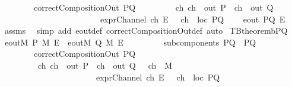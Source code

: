 \begin{isabellebody}
\ \ \ \ \ \ \ \ {\isachardoublequoteopen}correctCompositionOut\ PQ{\isachardoublequoteclose}\isanewline
\ \ \ \ \ \ \ \ {\isachardoublequoteopen}{\isasymexists}\ ch{\isachardot}\ {\isacharparenleft}{\isacharparenleft}{\isacharparenleft}ch\ {\isasymin}\ {\isacharparenleft}out\ P{\isacharparenright}{\isacharparenright}\ {\isasymor}\ {\isacharparenleft}ch\ {\isasymin}\ {\isacharparenleft}out\ Q{\isacharparenright}\ {\isacharparenright}{\isacharparenright}\ {\isasymand}\ \isanewline
\ \ \ \ \ \ \ \ \ \ \ \ \ \ \ \ \ \ \ \ \ \ \ \ {\isacharparenleft}exprChannel\ ch\ E{\isacharparenright}\ {\isasymand}\ \ {\isacharparenleft}ch\ {\isasymnotin}\ {\isacharparenleft}loc\ PQ{\isacharparenright}{\isacharparenright}{\isacharparenright}{\isachardoublequoteclose}\isanewline
{}\ \ \ \ {\isachardoublequoteopen}eout\ PQ\ E{\isachardoublequoteclose}\isanewline
%
\isadelimproof
%
\endisadelimproof
%
\isatagproof
{}\isamarkupfalse%
\ assms\ \isamarkupfalse%
\ {\isacharparenleft}simp\ add{\isacharcolon}\ eout{\isacharunderscore}def\ correctCompositionOut{\isacharunderscore}def{\isacharcomma}\ auto{\isacharparenright}%
\endisatagproof
{\isafoldproof}%
%
\isadelimproof
\isanewline
%
\endisadelimproof
\isanewline
{}\isamarkupfalse%
\ TBtheorem{}b{\isacharunderscore}PQ{\isacharcolon}\isanewline
{}\ {\isachardoublequoteopen}{\isacharparenleft}eoutM\ P\ M\ E{\isacharparenright}\ {\isasymor}\ {\isacharparenleft}eoutM\ Q\ M\ E{\isacharparenright}{\isachardoublequoteclose}\ \isanewline
\ \ \ \ \ \ \ \ {\isachardoublequoteopen}subcomponents\ PQ\ {\isacharequal}\ {\isacharbraceleft}P{\isacharcomma}Q{\isacharbraceright}{\isachardoublequoteclose}\isanewline
\ \ \ \ \ \ \ \ {\isachardoublequoteopen}correctCompositionOut\ PQ{\isachardoublequoteclose}\isanewline
\ \ \ \ \ \ \ \ {\isachardoublequoteopen}{\isasymexists}\ ch{\isachardot}\ {\isacharparenleft}{\isacharparenleft}{\isacharparenleft}ch\ {\isasymin}\ {\isacharparenleft}out\ P{\isacharparenright}{\isacharparenright}\ {\isasymor}\ {\isacharparenleft}ch\ {\isasymin}\ {\isacharparenleft}out\ Q{\isacharparenright}\ {\isacharparenright}{\isacharparenright}\ {\isasymand}\ {\isacharparenleft}ch\ {\isasymin}\ M{\isacharparenright}\ \isanewline
\ \ \ \ \ \ \ \ \ \ \ \ \ \ \ \ \ \ \ \ \ \ {\isasymand}\ {\isacharparenleft}exprChannel\ ch\ E{\isacharparenright}\ {\isasymand}\ \ {\isacharparenleft}ch\ {\isasymnotin}\ {\isacharparenleft}loc\ PQ{\isacharparenright}{\isacharparenright}{\isacharparenright}{\isachardoublequoteclose}\isanewline

\end{isabellebody}
